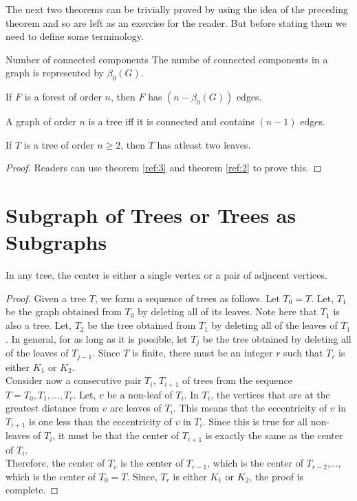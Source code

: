\documentclass[../basic_graph_theory.tex]{subfiles}
\begin{document}
The next two theorems can be trivially proved by using the idea of the preceding theorem and so are left as an exercise for the reader. But before stating them we need to define some terminology.

\begin{Def}{Number of connected components}{}
    The numbe of connected components in a graph is represented by $\beta_{0}(G)$.
\end{Def}

\begin{Thm}{}{}
    If $F$ is a forest of order $n$, then $F$ has $(n-\beta_{0}(G))$ edges.
\end{Thm}{}{}

\begin{Thm}{}{}
    \label{ref:2}
    A graph of order $n$ is a tree iff it is connected and contains $(n-1)$ edges.
\end{Thm}{}{}

\begin{Thm}{}{}
    If $T$ is a tree of order $n \ge 2$, then $T$ has atleast two leaves.
\end{Thm}{}{}
\begin{proof}
    Readers can use theorem \ref{ref:3} and theorem \ref{ref:2} to prove this.
\end{proof}

\section{Subgraph of Trees or Trees as Subgraphs}
\begin{Thm}{}{}
    In any tree, the center is either a single vertex or a pair of adjacent vertices.
\end{Thm}{}{}
\begin{proof}
    Given a tree $T$, we form a sequence of trees as follows. Let $T_0 = T$. Let, $T_1$ be the graph obtained from $T_0$ by deleting all of its leaves. Note here that $T_1$ is also a tree. Let, $T_2$ be the tree obtained from $T_1$ by deleting all of the leaves of $T_1$. In general, for as long as it is possible, let $T_j$ be the tree obtained by deleting all of the leaves of $T_{j-1}$. Since $T$ is finite, there must be an integer $r$ such that $T_r$ is either $K_1$ or $K_2$.\\
    Consider now a consecutive pair $T_i$, $T_{i+1}$ of trees from the sequence $T=T_0, T_1,..., T_r$. Let, $v$ be a non-leaf of $T_i$. In $T_i$, the vertices that are at the greatest distance from $v$ are leaves of $T_i$. This means that the eccentricity of $v$ in $T_{i+1}$ is one less than the eccentricity of $v$ in $T_i$. Since this is true for all non-leaves of $T_i$, it must be that the center of $T_{i+1}$ is exactly the same as the center of $T_i$.\\
    Therefore, the center of $T_r$ is the center of $T_{r-1}$, which is the center of $T_{r-2}$,..., which is the center of $T_0=T$. Since, $T_r$ is either $K_1$ or $K_2$, the proof is complete.
\end{proof}
\end{document}
